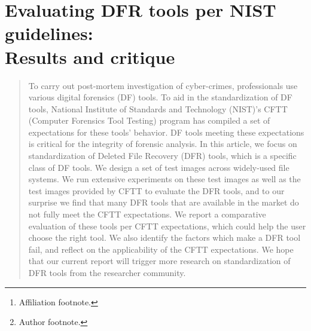 \documentclass{ws-rv9x6}
\begin{document}
\chapter[Evaluating DFR tools per NIST guidelines]{Evaluating DFR tools per NIST guidelines:\\ Results and critique \label{ra_ch1}}

\author[A. Meyer and S. Roy]{Andrew Meyer and S. Roy\footnote{Author footnote.}}

\address{Computer Science Department, BGSU,\\
Bowling Green, Ohio, USA 43403, \\
apmeyer@bgsu.edu\footnote{Affiliation footnote.}}
 
\begin{abstract}
To carry out post-mortem investigation of cyber-crimes, 
professionals use various digital forensics (DF) tools. 
To aid in the standardization of DF tools, 
National Institute of Standards and Technology (NIST)’s 
CFTT (Computer Forensics Tool Testing) program 
has compiled a set of expectations for these tools’ behavior. 
DF tools meeting these expectations is critical for the 
integrity of forensic analysis. In this article, we focus 
on standardization of Deleted File Recovery (DFR) tools, 
which is a specific class of DF tools. We design a set of 
test images across widely-used file systems. 
We run extensive experiments on these test images as well as 
the test images provided by CFTT to evaluate the DFR tools, 
and to our surprise we find that many DFR tools that are available 
in the market do not fully meet the CFTT expectations. 
We report a comparative evaluation of these tools per CFTT 
expectations, which could help the user choose the right tool. 
We also identify the factors which make a DFR tool fail, and 
reflect on the applicability of the CFTT expectations. 
We hope that our current report will trigger more research 
on standardization of DFR tools from the researcher community.
\end{abstract}


\body








\end{document}

